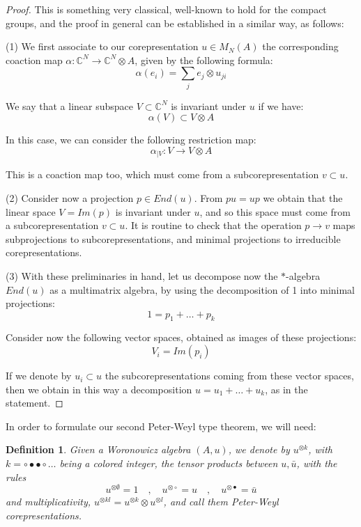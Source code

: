 \documentclass[12pt]{amsbook}
\newtheorem{definition}[theorem]{Definition}
\begin{document}
\begin{proof}
This is something very classical, well-known to hold for the compact groups, and the proof in general can be established in a similar way, as follows:

\medskip

(1) We first associate to our corepresentation $u\in M_N(A)$ the corresponding coaction map $\alpha:\mathbb C^N\to\mathbb C^N\otimes A$, given by the following formula:
$$\alpha(e_i)=\sum_je_j\otimes u_{ji}$$

We say that a linear subspace $V\subset\mathbb C^N$ is invariant under $u$ if we have:
$$\alpha(V)\subset V\otimes A$$

In this case, we can consider the following restriction map:
$$\alpha_{|V}:V\to V\otimes A$$

This is a coaction map too, which must come from a subcorepresentation $v\subset u$.

\medskip

(2) Consider now a projection $p\in End(u)$. From $pu=up$ we obtain that the linear space $V=Im(p)$ is invariant under $u$, and so this space must come from a subcorepresentation $v\subset u$. It is routine to check that the operation $p\to v$ maps subprojections to subcorepresentations, and minimal projections to irreducible corepresentations.

\medskip

(3) With these preliminaries in hand, let us decompose now the $*$-algebra $End(u)$ as a multimatrix algebra, by using the decomposition of 1 into minimal projections:
$$1=p_1+\ldots+p_k$$

Consider now the following vector spaces, obtained as images of these projections:
$$V_i=Im(p_i)$$

If we denote by $u_i\subset u$ the subcorepresentations coming from these vector spaces, then we obtain in this way a decomposition $u=u_1+\ldots+u_k$, as in the statement.
\end{proof}

In order to formulate our second Peter-Weyl type theorem, we will need:


\begin{definition}
Given a Woronowicz algebra $(A,u)$, we denote by $u^{\otimes k}$, with $k=\circ\bullet\bullet\circ\ldots$ being a colored integer, the tensor products between $u,\bar{u}$, with the rules 
$$u^{\otimes\emptyset}=1\quad,\quad 
u^{\otimes\circ}=u\quad,\quad 
u^{\otimes\bullet}=\bar{u}$$
and multiplicativity, $u^{\otimes kl}=u^{\otimes k}\otimes u^{\otimes l}$, and call them Peter-Weyl corepresentations. 
\end{definition}
\end{document}
